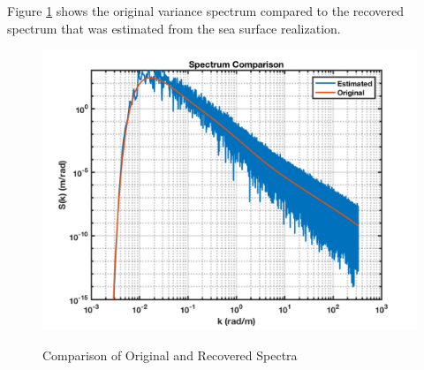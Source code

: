 Figure \ref{os_fig:9} shows the original variance spectrum compared to the recovered spectrum that was estimated from the sea surface realization.

\begin{figure}[H]
  \begin{center}
\includegraphics[width=5in]{../media/recreated_test_spectrum.png}
  \end{center}
  \renewcommand{\baselinestretch}{1} \small\normalsize
  \begin{quote}
    \caption[Comparison of Original and Recovered Spectra]{Comparison of Original and Recovered Spectra\label{os_fig:9}}
  \end{quote}
\end{figure}
\renewcommand{\baselinestretch}{2} \small\normalsize
